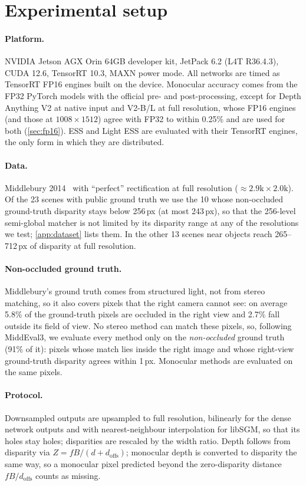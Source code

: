 \documentclass[10pt,twocolumn]{article}
\begin{document}
\section{Experimental setup}
\label{sec:setup}
\paragraph{Platform.} NVIDIA Jetson AGX Orin 64GB developer kit, JetPack 6.2 (L4T R36.4.3), CUDA
12.6, TensorRT 10.3, MAXN power mode. All networks are timed as TensorRT FP16 engines built on the
device. Monocular accuracy comes from the FP32 PyTorch models with the official pre- and
post-processing, except for Depth Anything V2 at native input and V2-B/L at full resolution, whose
FP16 engines (and those at $1008\times1512$) agree with FP32 to within 0.25\% and are used for both
(\cref{sec:fp16}). ESS and Light ESS
are evaluated with their TensorRT engines, the only form in which they are distributed.

\paragraph{Data.} Middlebury 2014~\cite{scharstein2014middlebury} with ``perfect'' rectification at full
resolution (${\approx}2.9\text{k}\times2.0\text{k}$). Of the 23 scenes with public ground truth we use
the 10 whose non-occluded ground-truth disparity stays below 256\,px (at most 243\,px), so that the
256-level semi-global matcher is not limited by its disparity range at any of the resolutions we
test; \cref{app:dataset} lists them. In the other 13 scenes near objects reach 265--712\,px of disparity
at full resolution.

\paragraph{Non-occluded ground truth.} Middlebury's ground truth comes from structured light, not from
stereo matching, so it also covers pixels that the right camera cannot see: on average 5.8\% of the
ground-truth pixels are occluded in the right view and 2.7\% fall outside its field of view. No stereo
method can match these pixels, so, following MiddEval3, we evaluate every method only on the
\emph{non-occluded} ground truth (91\% of it): pixels whose match lies inside the right image and
whose right-view ground-truth disparity agrees within 1\,px. Monocular methods are evaluated on the
same pixels.

\paragraph{Protocol.} Downsampled outputs are upsampled to full resolution, bilinearly for the dense
network outputs and with nearest-neighbour interpolation for libSGM, so that its holes stay holes;
disparities are rescaled by the width ratio. Depth follows from disparity via $Z=fB/(d+d_\text{offs})$; monocular
depth is converted to disparity the same way, so a monocular pixel predicted beyond the
zero-disparity distance $fB/d_\text{offs}$ counts as missing.
\end{document}
